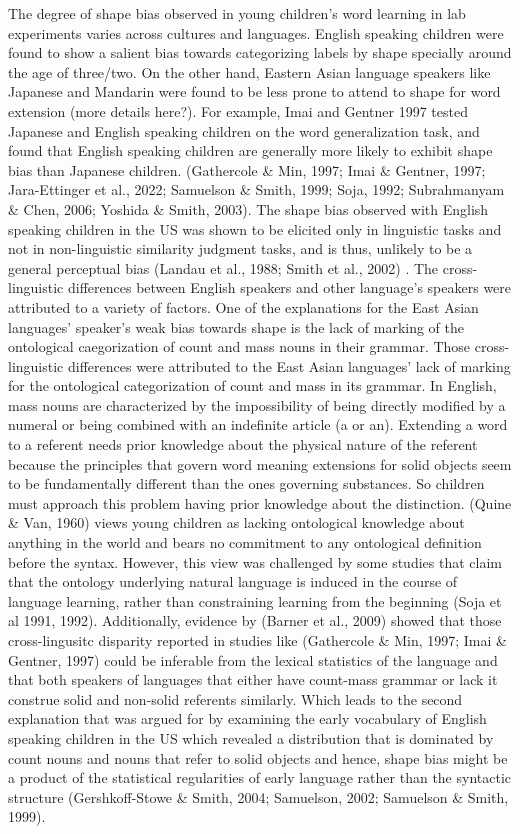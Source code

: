 \documentclass[
  man]{apa6}
\begin{document}
The degree of shape bias observed in young children's word learning in lab experiments varies across cultures and languages. English speaking children were found to show a salient bias towards categorizing labels by shape specially around the age of three/two. On the other hand, Eastern Asian language speakers like Japanese and Mandarin were found to be less prone to attend to shape for word extension (more details here?). For example, Imai and Gentner 1997 tested Japanese and English speaking children on the word generalization task, and found that English speaking children are generally more likely to exhibit shape bias than Japanese children. (Gathercole \& Min, 1997; Imai \& Gentner, 1997; Jara-Ettinger et al., 2022; Samuelson \& Smith, 1999; Soja, 1992; Subrahmanyam \& Chen, 2006; Yoshida \& Smith, 2003).
The shape bias observed with English speaking children in the US was shown to be elicited only in linguistic tasks and not in non-linguistic similarity judgment tasks, and is thus, unlikely to be a general perceptual bias (Landau et al., 1988; Smith et al., 2002) . The cross-linguistic differences between English speakers and other language's speakers were attributed to a variety of factors. One of the explanations for the East Asian languages' speaker's weak bias towards shape is the lack of marking of the ontological caegorization of count and mass nouns in their grammar.
Those cross-linguistic differences were attributed to the East Asian languages' lack of marking for the ontological categorization of count and mass in its grammar. In English, mass nouns are characterized by the impossibility of being directly modified by a numeral or being combined with an indefinite article (a or an). Extending a word to a referent needs prior knowledge about the physical nature of the referent because the principles that govern word meaning extensions for solid objects seem to be fundamentally different than the ones governing substances. So children must approach this problem having prior knowledge about the distinction. (Quine \& Van, 1960) views young children as lacking ontological knowledge about anything in the world and bears no commitment to any ontological definition before the syntax. However, this view was challenged by some studies that claim that the ontology underlying natural language is induced in the course of language learning, rather than constraining learning from the beginning (Soja et al 1991, 1992). Additionally, evidence by (Barner et al., 2009) showed that those cross-lingusitc disparity reported in studies like (Gathercole \& Min, 1997; Imai \& Gentner, 1997) could be inferable from the lexical statistics of the language and that both speakers of languages that either have count-mass grammar or lack it construe solid and non-solid referents similarly. Which leads to the second explanation that was argued for by examining the early vocabulary of English speaking children in the US which revealed a distribution that is dominated by count nouns and nouns that refer to solid objects and hence, shape bias might be a product of the statistical regularities of early language rather than the syntactic structure (Gershkoff-Stowe \& Smith, 2004; Samuelson, 2002; Samuelson \& Smith, 1999).
\end{document}
